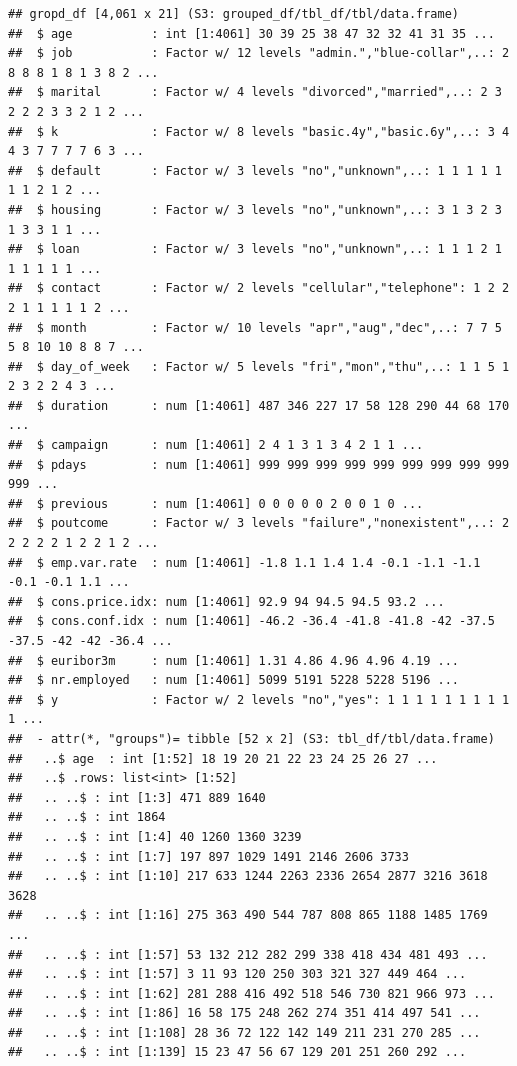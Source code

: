 \documentclass[
]{article}
\begin{document}
\begin{verbatim}
## gropd_df [4,061 x 21] (S3: grouped_df/tbl_df/tbl/data.frame)
##  $ age           : int [1:4061] 30 39 25 38 47 32 32 41 31 35 ...
##  $ job           : Factor w/ 12 levels "admin.","blue-collar",..: 2 8 8 8 1 8 1 3 8 2 ...
##  $ marital       : Factor w/ 4 levels "divorced","married",..: 2 3 2 2 2 3 3 2 1 2 ...
##  $ k             : Factor w/ 8 levels "basic.4y","basic.6y",..: 3 4 4 3 7 7 7 7 6 3 ...
##  $ default       : Factor w/ 3 levels "no","unknown",..: 1 1 1 1 1 1 1 2 1 2 ...
##  $ housing       : Factor w/ 3 levels "no","unknown",..: 3 1 3 2 3 1 3 3 1 1 ...
##  $ loan          : Factor w/ 3 levels "no","unknown",..: 1 1 1 2 1 1 1 1 1 1 ...
##  $ contact       : Factor w/ 2 levels "cellular","telephone": 1 2 2 2 1 1 1 1 1 2 ...
##  $ month         : Factor w/ 10 levels "apr","aug","dec",..: 7 7 5 5 8 10 10 8 8 7 ...
##  $ day_of_week   : Factor w/ 5 levels "fri","mon","thu",..: 1 1 5 1 2 3 2 2 4 3 ...
##  $ duration      : num [1:4061] 487 346 227 17 58 128 290 44 68 170 ...
##  $ campaign      : num [1:4061] 2 4 1 3 1 3 4 2 1 1 ...
##  $ pdays         : num [1:4061] 999 999 999 999 999 999 999 999 999 999 ...
##  $ previous      : num [1:4061] 0 0 0 0 0 2 0 0 1 0 ...
##  $ poutcome      : Factor w/ 3 levels "failure","nonexistent",..: 2 2 2 2 2 1 2 2 1 2 ...
##  $ emp.var.rate  : num [1:4061] -1.8 1.1 1.4 1.4 -0.1 -1.1 -1.1 -0.1 -0.1 1.1 ...
##  $ cons.price.idx: num [1:4061] 92.9 94 94.5 94.5 93.2 ...
##  $ cons.conf.idx : num [1:4061] -46.2 -36.4 -41.8 -41.8 -42 -37.5 -37.5 -42 -42 -36.4 ...
##  $ euribor3m     : num [1:4061] 1.31 4.86 4.96 4.96 4.19 ...
##  $ nr.employed   : num [1:4061] 5099 5191 5228 5228 5196 ...
##  $ y             : Factor w/ 2 levels "no","yes": 1 1 1 1 1 1 1 1 1 1 ...
##  - attr(*, "groups")= tibble [52 x 2] (S3: tbl_df/tbl/data.frame)
##   ..$ age  : int [1:52] 18 19 20 21 22 23 24 25 26 27 ...
##   ..$ .rows: list<int> [1:52] 
##   .. ..$ : int [1:3] 471 889 1640
##   .. ..$ : int 1864
##   .. ..$ : int [1:4] 40 1260 1360 3239
##   .. ..$ : int [1:7] 197 897 1029 1491 2146 2606 3733
##   .. ..$ : int [1:10] 217 633 1244 2263 2336 2654 2877 3216 3618 3628
##   .. ..$ : int [1:16] 275 363 490 544 787 808 865 1188 1485 1769 ...
##   .. ..$ : int [1:57] 53 132 212 282 299 338 418 434 481 493 ...
##   .. ..$ : int [1:57] 3 11 93 120 250 303 321 327 449 464 ...
##   .. ..$ : int [1:62] 281 288 416 492 518 546 730 821 966 973 ...
##   .. ..$ : int [1:86] 16 58 175 248 262 274 351 414 497 541 ...
##   .. ..$ : int [1:108] 28 36 72 122 142 149 211 231 270 285 ...
##   .. ..$ : int [1:139] 15 23 47 56 67 129 201 251 260 292 ...

\end{verbatim}
\end{document}
